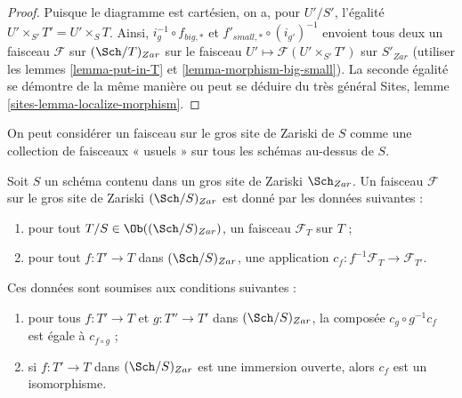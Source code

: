 \begin{proof}
Puisque le diagramme est cartésien, on a, pour $U'/S'$,
l'égalité $U' \times_{S'} T' = U' \times_S T$. Ainsi,
$i_g^{-1} \circ f_{big, *}$ et $f'_{small, *} \circ (i_{g'})^{-1}$
envoient tous deux un faisceau $\mathcal{F}$ sur $(\Sch/T)_{Zar}$ sur le faisceau
$U' \mapsto \mathcal{F}(U' \times_{S'} T')$ sur $S'_{Zar}$
(utiliser les lemmes \ref{lemma-put-in-T} et \ref{lemma-morphism-big-small}).
La seconde égalité se démontre de la même manière ou peut se
déduire du très général
Sites, lemme \ref{sites-lemma-localize-morphism}.
\end{proof}

\noindent
On peut considérer un faisceau sur le gros site de Zariski de $S$ comme une collection
de faisceaux « usuels » sur tous les schémas au-dessus de $S$.

\begin{lemma}
\label{lemma-characterize-sheaf-big}
Soit $S$ un schéma contenu dans un gros site de Zariski $\Sch_{Zar}$.
Un faisceau $\mathcal{F}$ sur le gros site de Zariski $(\Sch/S)_{Zar}$
est donné par les données suivantes :
\begin{enumerate}
\item pour tout $T/S \in \Ob((\Sch/S)_{Zar})$, un faisceau
$\mathcal{F}_T$ sur $T$ ;
\item pour tout $f : T' \to T$ dans
$(\Sch/S)_{Zar}$, une application
$c_f : f^{-1}\mathcal{F}_T \to \mathcal{F}_{T'}$.
\end{enumerate}
Ces données sont soumises aux conditions suivantes :
\begin{enumerate}
\item[(a)] pour tous $f : T' \to T$ et $g : T'' \to T'$ dans
$(\Sch/S)_{Zar}$, la composée $c_g \circ g^{-1}c_f$
est égale à $c_{f \circ g}$ ;
\item[(b)] si $f : T' \to T$ dans $(\Sch/S)_{Zar}$ est une
immersion ouverte, alors $c_f$ est un isomorphisme.
\end{enumerate}
\end{lemma}

